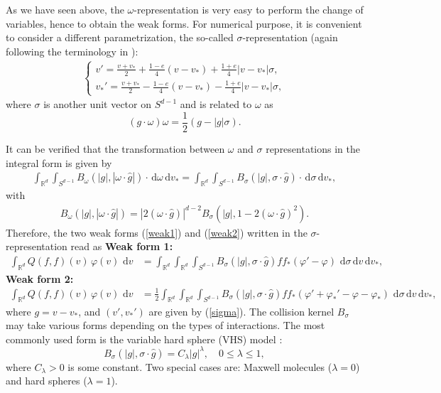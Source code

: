 \documentclass[review,times]{elsarticle}
\newcommand{\rd}{\,\mathrm{d}}
\begin{document}
As we have seen above, the $\omega$-representation is very easy to perform the change of variables, hence to obtain the weak forms. For numerical purpose, it is convenient to consider a different parametrization, the so-called $\sigma$-representation (again following the terminology in \cite{Villani02}):
\begin{align} \label{sigma}
\left\{
\begin{array}{l}
\displaystyle v'=\frac{v+v_*}{2}+\frac{1-e}{4}(v-v_*)+\frac{1+e}{4}|v-v_*|\sigma, \\[8pt]
\displaystyle v_*'=\frac{v+v_*}{2}- \frac{1-e}{4}(v-v_*)-\frac{1+e}{4}|v-v_*|\sigma,
\end{array}\right.
\end{align}
where $\sigma$ is another unit vector on $S^{d-1}$ and is related to $\omega$ as
\begin{equation} \label{relation}
(g\cdot \omega)\omega=\frac{1}{2}(g-|g|\sigma).
\end{equation}

It can be verified that the transformation between $\omega$ and $\sigma$ representations in the integral form is given by
\begin{align}
\int_{\mathbb{R}^d}\int_{S^{d-1}}B_{\omega}(|g|,|\omega\cdot \hat{g}|)\cdot \rd{\omega}\rd{v_*}=\int_{\mathbb{R}^d}\int_{S^{d-1}}B_{\sigma}(|g|,\sigma\cdot \hat{g})\cdot \rd{\sigma}\rd{v_*},
\end{align}
with 
\begin{align}
B_{\omega}(|g|, |\omega\cdot \hat{g}|) =|2(\omega\cdot \hat{g})|^{d-2}B_{\sigma}(|g|,1-2(\omega\cdot\hat{g})^2).
\end{align}
Therefore, the two weak forms (\ref{weak1}) and (\ref{weak2}) written in the $\sigma$-representation read as
{\bf Weak form 1:}
\begin{align} \label{weak11}
\int_{\mathbb{R}^d} Q(f,f)(v)\,\varphi(v)\,\rd{v}&= \int_{\mathbb{R}^d} \int_{\mathbb{R}^d} \int_{S^{d-1}} B_{\sigma}(|g|,\sigma\cdot \hat{g})ff_*  \left(\varphi'-\varphi\right)\,\rd{\sigma} \rd{v} \rd{v_*},
\end{align}
{\bf Weak form 2:}
\begin{align} \label{weak22}
\int_{\mathbb{R}^d} Q(f,f)(v)\,\varphi(v)\,\rd{v}&=\frac{1}{2} \int_{\mathbb{R}^d} \int_{\mathbb{R}^d} \int_{S^{d-1}} B_{\sigma}(|g|,\sigma\cdot \hat{g})ff_*\left(\varphi'+\varphi_*'-\varphi-\varphi_* \right)\,\rd{\sigma} \rd{v} \rd{v_*},
\end{align}
where $g=v-v_*$, and $(v',v_*')$ are given by (\ref{sigma}). The collision kernel $B_{\sigma}$ may take various forms depending on the types of interactions. The most commonly used form is the variable hard sphere (VHS) model \cite{Bird}:
\begin{equation} \label{VHS}
B_{\sigma}(|g|,\sigma\cdot \hat{g})=C_{\lambda}|g|^{\lambda}, \quad 0\leq \lambda \leq 1,
\end{equation}
where $C_{\lambda}> 0$ is some constant. Two special cases are: Maxwell molecules ($\lambda=0$) and hard spheres ($\lambda=1$). 
\end{document}
